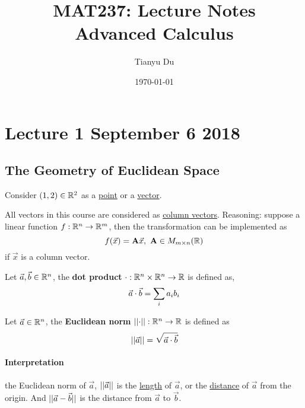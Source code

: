 \documentclass[]{article}
\title{MAT237: Lecture Notes \\ \small Advanced Calculus}
\date{\today}
\author{Tianyu Du}
\begin{document}
    \maketitle
    \tableofcontents
    
    \newpage
    
    \section{Lecture 1 September 6 2018}
        \subsection{The Geometry of Euclidean Space}
        \begin{example}
            Consider $(1, 2) \in \mathbb{R}^2$ as a \ul{point} or a \ul{vector}.
        \end{example}
        
        \begin{remark}
            All vectors in this course are considered as \ul{column vectors}. Reasoning: suppose a linear function ${f}: {\mathbb{R}^n} \to {\mathbb{R}^m}$, then the transformation can be implemented as 
            \[
                f(\vec{x}) = \textbf{A}\vec{x},\ \textbf{A} \in M_{{m} \times {n}}(\mathbb{R})
            \]
            if $\vec{x}$ is a column vector.
        \end{remark}
        
        \begin{definition}
            Let $\vec{a}, \vec{b} \in \mathbb{R}^n$, the \textbf{dot product} ${\cdot}: {\mathbb{R}^n \times \mathbb{R}^n} \to {\mathbb{R}}$ is defined as,
            \[
                \vec{a} \cdot \vec{b} = \sum_{i}{a_i b_i}
            \]
        \end{definition}
        
        \begin{definition}
            Let $\vec{a} \in \mathbb{R}^n$, the \textbf{Euclidean norm} ${\vert \vert {\cdot} \vert \vert}: {\mathbb{R}^n} \to {\mathbb{R}}$ is defined as 
            \[
                \vert \vert \vec{{a}} \vert \vert = \sqrt{\vec{a} \cdot \vec{b}}
            \]
        \end{definition}
        
        \paragraph{Interpretation} the Euclidean norm of $\vec{a}$, $\vert \vert \vec{{a}} \vert \vert$ is the \ul{length} of $\vec{a}$, or the \ul{distance} of $\vec{a}$ from the origin. And $\vert \vert {\vec{a} - \vec{b}} \vert \vert$ is the distance from $\vec{a}$ to $\vec{b}$.
        
\end{document}
